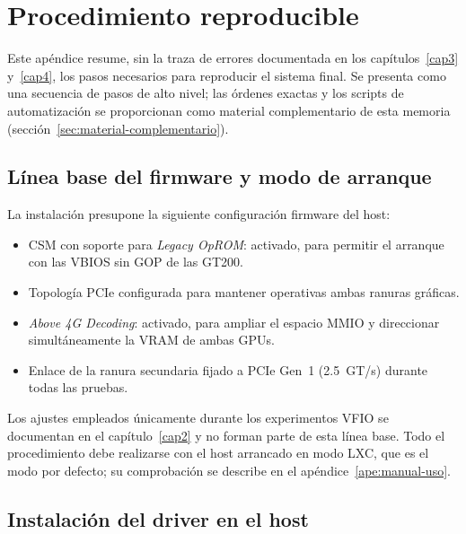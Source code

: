 \chapter{Procedimiento reproducible} \label{ape:host} \label{ape:contenedor-cuda}

Este apéndice resume, sin la traza de errores documentada en los capítulos~\ref{cap3} y~\ref{cap4}, los pasos necesarios para reproducir el sistema final. Se presenta como una secuencia de pasos de alto nivel; las órdenes exactas y los scripts de automatización se proporcionan como material complementario de esta memoria (sección~\ref{sec:material-complementario}).

\section{Línea base del firmware y modo de arranque}

La instalación presupone la siguiente configuración firmware del host:

\begin{itemize}
    \item CSM con soporte para \textit{Legacy OpROM}: activado, para permitir el arranque con las VBIOS sin GOP de las GT200.
    \item Topología PCIe configurada para mantener operativas ambas ranuras gráficas.
    \item \textit{Above 4G Decoding}: activado, para ampliar el espacio MMIO y direccionar simultáneamente la VRAM de ambas GPUs.
    \item Enlace de la ranura secundaria fijado a PCIe Gen~1 (2.5~GT/s) durante todas las pruebas.
\end{itemize}

Los ajustes empleados únicamente durante los experimentos VFIO se documentan en el capítulo~\ref{cap2} y no forman parte de esta línea base. Todo el procedimiento debe realizarse con el host arrancado en modo LXC, que es el modo por defecto; su comprobación se describe en el apéndice~\ref{ape:manual-uso}.

\section{Instalación del driver en el host}


